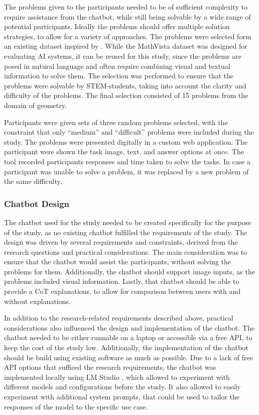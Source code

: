 The problems given to the participants needed to be of sufficient complexity to require assistance from the chatbot, while still being solvable by a wide range of potential participants. Ideally the problems should offer multiple solution strategies, to allow for a variety of approaches. The problems were selected form an existing dataset inspired by \textcite{Wang2024}. While the MathVista dataset \parencite{MathVista2024} was designed for evaluating \ac{AI} systems, it can be reused for this study, since the problems are posed in natural language and often require combining visual and textual information to solve them. The selection was performed to ensure that the problems were solvable by \ac{STEM}-students, taking into account the clarity and difficulty of the problems. The final selection consisted of 15 problems from the domain of geometry.

Participants were given sets of three random problems selected, with the constraint that only “medium” and “difficult” problems were included during the study. The problems were presented digitally in a custom web application. The participant were shown the task image, text, and answer options at once. The tool recorded participants responses and time taken to solve the tasks. In case a participant was unable to solve a problem, it was replaced by a new problem of the same difficulty.

\subsubsection{Chatbot Design} \label{sssec:chatbot_design}

The chatbot used for the study needed to be created specifically for the purpose of the study, as no existing chatbot fulfilled the requirements of the study. The design was driven by several requirements and constraints, derived from the research questions and practical considerations. The main consideration was to ensure that the chatbot would assist the participants, without solving the problems for them. Additionally, the chatbot should support image inputs, as the problems included visual information. Lastly, that chatbot should be able to provide a \ac{CoT} explanations, to allow for comparison between users with and without explanations.

In addition to the research-related requirements described above, practical considerations also influenced the design and implementation of the chatbot. The chatbot needed to be either runnable on a laptop or accessible via a free API, to keep the cost of the study low. Additionally, the implementation of the chatbot should be build using existing software as much as possible. Due to a lack of free API options that sufficed the research requirements, the chatbot was implemented locally using LM Studio \parencite{ElementLabs2025}, which allowed to experiment with different models and configurations before the study. It also allowed to easily experiment with additional system prompts, that could be used to tailor the responses of the model to the specific use case.


